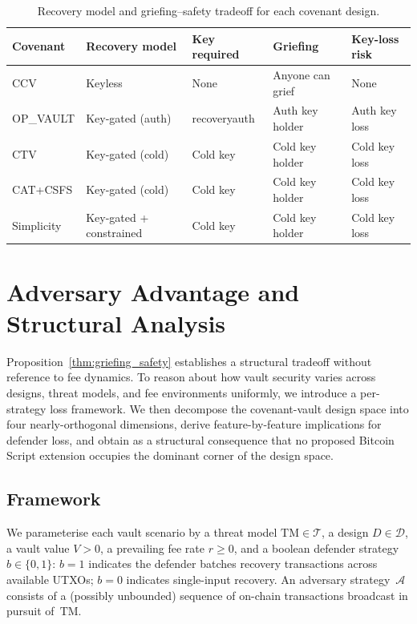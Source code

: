 \begin{table}[t]
\centering
\caption{Recovery model and griefing--safety tradeoff for each covenant design.}
\label{tab:griefing_spectrum}
\begin{tabular}{@{}lllll@{}}
\toprule
Covenant & Recovery model & Key required & Griefing & Key-loss risk \\
\midrule
CCV       & Keyless           & None         & Anyone can grief & None \\
OP\_VAULT & Key-gated (auth)  & recoveryauth & Auth key holder  & Auth key loss \\
CTV       & Key-gated (cold)  & Cold key     & Cold key holder  & Cold key loss \\
CAT+CSFS  & Key-gated (cold)  & Cold key     & Cold key holder  & Cold key loss \\
Simplicity & Key-gated + constrained & Cold key & Cold key holder & Cold key loss \\
\bottomrule
\end{tabular}
\end{table}

\section{Adversary Advantage and Structural Analysis} \label{se:thm_inversion}

Proposition~\ref{thm:griefing_safety} establishes a structural tradeoff
without reference to fee dynamics. To reason about how vault security
varies across designs, threat models, and fee environments uniformly,
we introduce a per-strategy loss framework. We then decompose the
covenant-vault design space into four nearly-orthogonal dimensions,
derive feature-by-feature implications for defender loss, and obtain
as a structural consequence that no proposed Bitcoin Script extension
occupies the dominant corner of the design space.

\subsection{Framework}
\label{ss:framework}

We parameterise each vault scenario by a threat model
$\mathrm{TM} \in \mathcal{T}$, a design $D \in \mathcal{D}$, a vault
value $V > 0$, a prevailing fee rate $r \geq 0$, and a boolean defender
strategy $b \in \{0, 1\}$: $b = 1$ indicates the defender batches
recovery transactions across available UTXOs; $b = 0$ indicates
single-input recovery. An adversary strategy~$\mathcal{A}$ consists of a
(possibly unbounded) sequence of on-chain transactions broadcast in
pursuit of~$\mathrm{TM}$.

